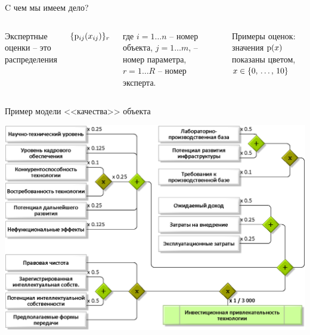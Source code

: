 \begin{frame}{C чем мы имеем дело?}
	\vspace*{3mm}
	\begin{columns}
		Экспертные оценки -- это распределения 
		{\large \begin{center} \hspace{-20mm}  $\{ {\mathrm{p}}_{ij}(x_{ij}) \}_r$ \end{center} }
		{\footnotesize где $i = 1 \ldots n$ -- номер объекта, $j = 1 \ldots m$, -- номер параметра, $r = 1 \ldots R$ -- номер эксперта}.  
		\begin{center}
			\vspace*{-8mm}
			  {\scriptsize {Примеры оценок: значения ${\mathrm{p}}(x)$ показаны цветом, $x \in \{0,\, \ldots,\, 10\}$}}
			  \\ \vspace*{2mm}
		\end{center}
	\end{columns}
 	
\end{frame} %

\begin{frame}{Пример модели <<качества>> объекта}
	\begin{center}
		\includegraphics[width=0.9\linewidth]{./pic/schemeF2}
	\end{center}
\end{frame} %

